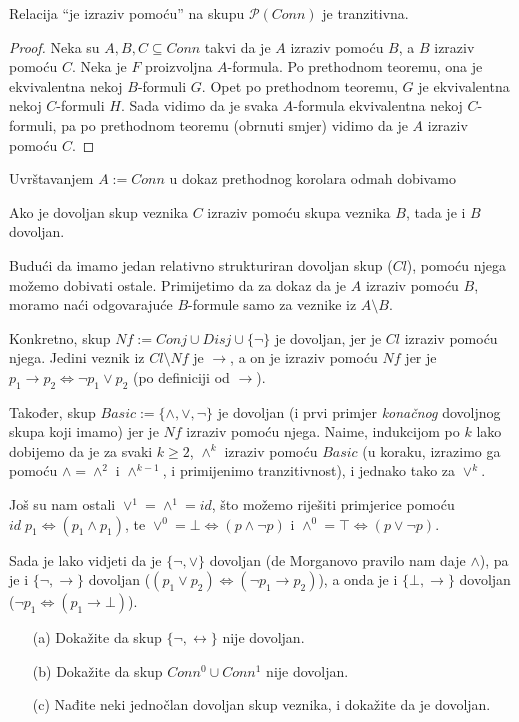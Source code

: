 \begin{korolar}
	Relacija ``je izraziv pomoću'' na skupu $\mathcal P(Conn)$ je tranzitivna.
\end{korolar}

\begin{proof}
	Neka su $A, B, C\subseteq Conn$ takvi da je $A$ izraziv pomoću $B$, a $B$ izraziv pomoću $C$. Neka je $F$ proizvoljna $A$-formula. Po prethodnom teoremu, ona je ekvivalentna nekoj $B$-formuli $G$. Opet po prethodnom teoremu, $G$ je ekvivalentna nekoj $C$-formuli $H$. Sada vidimo da je svaka $A$-formula ekvivalentna nekoj $C$-formuli, pa po prethodnom teoremu (obrnuti smjer) vidimo da je $A$ izraziv pomoću $C$.
\end{proof}

Uvrštavanjem $A:=Conn$ u dokaz prethodnog korolara odmah dobivamo

\begin{korolar}
	Ako je dovoljan skup veznika $C$ izraziv pomoću skupa veznika $B$, tada je i $B$ dovoljan.
\end{korolar}

Budući da imamo jedan relativno strukturiran dovoljan skup ($Cl$), po\-mo\-ću njega možemo dobivati ostale. Primijetimo da za dokaz da je $A$ izraziv pomoću $B$, moramo naći odgovarajuće $B$-formule samo za veznike iz $A\setminus B$. 

Konkretno, skup
$Nf:=Conj\cup Disj\cup\{\neg\}$ je dovoljan, jer je $Cl$ izraziv pomoću njega. Jedini veznik iz $Cl\setminus Nf$ je $\to$, a on je izraziv pomoću $Nf$ jer je
$p_1\to p_2\Leftrightarrow\neg p_1\vee p_2$ (po definiciji od $\to$).

Također, skup
$Basic:=\{\wedge, \vee, \neg\}$ je dovoljan (i prvi primjer \emph{konačnog} dovoljnog skupa koji imamo) jer je $Nf$ izraziv pomoću njega. Naime, indukcijom po $k$ lako dobijemo da je za svaki $k\ge 2$, $\wedge^k$ izraziv pomoću $Basic$ (u koraku, izrazimo ga pomoću $\wedge=\wedge^2$ i $\wedge^{k-1}$, i primijenimo tranzitivnost), i jednako tako za $\vee^k$.

Još su nam ostali $\vee^1=\wedge^1=id$, što možemo riješiti primjerice pomoću $id\; p_1\Leftrightarrow(p_1\wedge p_1)$, te $\vee^0=\bot\Leftrightarrow (p\wedge\neg p)$ i $\wedge^0=\top\Leftrightarrow(p\vee\neg p)$.

Sada je lako vidjeti da je
$\{\neg,\vee\}$ dovoljan (de Morganovo pravilo nam daje $\wedge$), pa je i $\{\neg, \to\}$ dovoljan ($(p_1\vee p_2)\Leftrightarrow(\neg p_1\to p_2)$), a onda je i $\{\bot,\to\}$ dovoljan ($\neg p_1\Leftrightarrow(p_1\to\bot)$).

\begin{zadatak}\begin{enumerate}
		\item[(a)] Dokažite da skup $\{\neg,\leftrightarrow\}$ nije dovoljan.
		\item[(b)] Dokažite da skup $Conn^0\cup Conn^1$ nije dovoljan.
		\item[(c)] Nađite neki jednočlan dovoljan skup veznika, i dokažite da je dovoljan.
	\end{enumerate}
\end{zadatak}